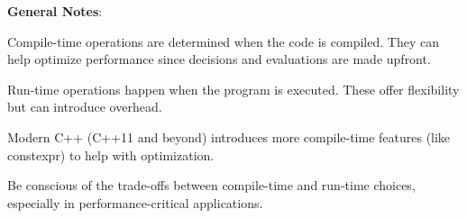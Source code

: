 {\bfseries{General Notes}}\+:


\begin{DoxyItemize}
\item Compile-\/time operations are determined when the code is compiled. They can help optimize performance since decisions and evaluations are made upfront.
\item Run-\/time operations happen when the program is executed. These offer flexibility but can introduce overhead.
\item Modern C++ (C++11 and beyond) introduces more compile-\/time features (like {\ttfamily constexpr}) to help with optimization.
\item Be conscious of the trade-\/offs between compile-\/time and run-\/time choices, especially in performance-\/critical applications. 
\end{DoxyItemize}